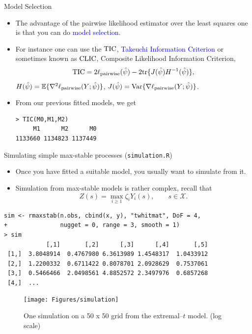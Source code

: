 \documentclass[mode=present,style=simple,paper=screen]{powerdot}
\theoremstyle{plain}%
\theoremstyle{definition}
\theoremstyle{remark}
\begin{document}
\begin{slide}[method=direct,toc= Model selection]{Model Selection \citep{Varin2005}}
  \begin{itemize}
  \item The advantage of the pairwise likelihood estimator over the
    least squares one is that you can do \textcolor{blue}{model
      selection}.
  \item For instance one can use the ${\rm TIC}$,
    \textcolor{blue}{Takeuchi Information Criterion} or sometimes
    known as ${\rm CLIC}$, Composite Likelihood Information Criterion,
    \begin{equation*}
      {\rm TIC} = 2 \ell_{\rm pairwise}(\hat \psi) - 2
      \mbox{tr}\{J(\hat \psi) H^{-1} (\hat \psi)\},
    \end{equation*}
    $H(\hat\psi) = \mathbb{E} \{\nabla^2 \ell_{\rm pairwise}(Y; \hat
    \psi) \}$, $J(\hat \psi) = \mbox{Var}\{\nabla \ell_{\rm
      pairwise}(Y; \hat\psi)\}$.
  \item From our previous fitted models, we get
{\tiny
\begin{verbatim}
> TIC(M0,M1,M2)
     M1      M2      M0
1133660 1134823 1137449
\end{verbatim}
}
  \end{itemize}
\end{slide}

\begin{slide}[toc=Simulation,method=direct]{Simulating simple max-stable processes
    (\texttt{simulation.R}) \citep{Schlather2002,Dombry2016}}
  \begin{itemize}
  \item Once you have fitted a suitable model, you usually want to
    simulate from it.
  \item Simulation from max-stable models is rather complex, recall
    that
    \begin{equation*}
      Z(s) = \max_{i \geq 1} \zeta_i Y_i(s), \qquad s \in \mathcal{X}.
    \end{equation*}
  \end{itemize}
  \begin{minipage}[l]{.6\linewidth}
{\tiny
\begin{verbatim}
sim <- rmaxstab(n.obs, cbind(x, y), "twhitmat", DoF = 4,
+               nugget = 0, range = 3, smooth = 1)
> sim
            [,1]       [,2]      [,3]      [,4]       [,5]
 [1,]  3.8048914  0.4767980 6.3613989 1.4548317  1.0433912
 [2,]  1.2200332  0.6711422 0.8078701 2.0928629  0.7537061
 [3,]  0.5466466  2.0498561 4.8852572 2.3497976  0.6857268
 [4,]  ...
\end{verbatim}
}
  \end{minipage}
  \hfill
  \begin{minipage}[r]{.33\linewidth}
    \begin{figure}
      \centering
      \texttt{[image: Figures/simulation]}
      \caption{One simulation on a 50 x 50 grid from the extremal--$t$
        model. (log scale)}
    \end{figure}
  \end{minipage}
\end{slide}
\end{document}
